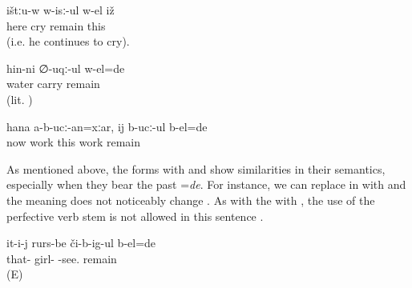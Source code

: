 \begin{exe}
	\ex	\label{ex:Here he is crying (i.e. he continues to cry).}
	\gll	ištːu-w	w-isː-ul	w-el	iž\\
		here	cry	remain	this\\
	\glt	{} (i.e. he continues to cry).

	\ex	\label{ex:‎‎‎He was taken away by the water}
	\gll	hin-ni	∅-uqː-ul	w-el=de\\
		water	carry	remain\\
	\glt	{} (lit. )

	\ex	\label{ex:‎‎Even though now (my hand) does not work, (at that time) it worked}
	\gll	hana	a-b-ucː-an=xːar,	ij	b-ucː-ul	b-el=de\\
		now	work	this	work	remain\\
	\glt	{}
	
\end{exe}

As mentioned above, the forms with  and  show similarities in their semantics, especially when they bear the past  =\textit{de}. For instance, we can replace  in  with  and the meaning does not noticeably change . As with the  with , the use of the perfective verb stem is not allowed in this sentence .

\begin{exe}
	\ex	\label{‎‎He was seeing the girls.BEL}
	\gll it-i-j	rurs-be	či-b-ig-ul	b-el=de\\
	that-	girl-	-see.	remain\\
	\glt {} (E)
	

\end{exe}


